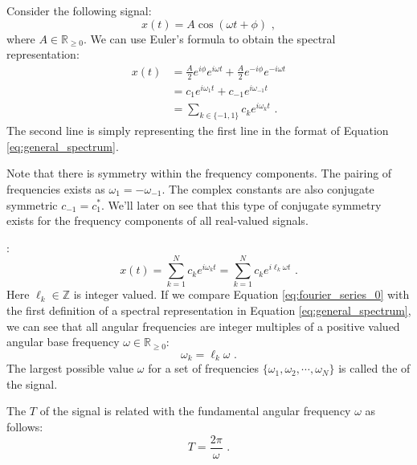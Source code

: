 Consider the following signal:
\begin{equation}
  x(t)=A\cos(\omega t+\phi) \,\,,
\end{equation}
where $A\in \mathbb{R}_{\ge 0}$. We can use Euler's formula to obtain the spectral representation:
\begin{align}
  x(t) & = \frac{A}{2}e^{i\phi}e^{i\omega t} + \frac{A}{2}e^{-i\phi}e^{-i\omega t} \\
       & = c_1 e^{i\omega_1 t} + c_{-1} e^{i\omega_{-1} t}                         \\
       & = \sum_{k\in\{-1,1\}} c_k e^{i\omega_k t} \,\,.
\end{align}
The second line is simply representing the first line in the format of Equation \ref{eq:general_spectrum}.

Note that there is symmetry within the frequency components. The pairing of frequencies exists as $\omega_{1}=-\omega_{-1}$.
The complex constants are also conjugate symmetric $c_{-1} = c_{1}^*$. We'll later on see
that this type of conjugate symmetry exists for the frequency components of all real-valued signals.

:
\begin{equation}
  x(t) = \sum_{k=1}^N c_k e^{i \omega_k t} = \sum_{k=1}^N c_k e^{i \ell_k \omega t} \,\,.
  \label{eq:fourier_series_0}
\end{equation}
Here $\ell_k \in \mathbb{Z}$ is integer valued. If we compare Equation \ref{eq:fourier_series_0} with
the first definition of a spectral representation in Equation \ref{eq:general_spectrum}, we can see
that all angular frequencies are integer multiples of a positive valued angular
base frequency $\omega \in \mathbb{R}_{\ge 0}$:
\begin{equation}
  \omega_k = \ell_k\omega \,\,.
  \label{eq:integer_multiple}
\end{equation}
The largest possible value $\omega$ for a set of frequencies $\{\omega_1,\omega_2,\cdots,\omega_N\}$
is called the \emph{} of the signal.

The \emph{} $T$ of the signal is related with the
fundamental angular frequency $\omega$ as follows:
\begin{equation}
  \boxed{
    T = \frac{2\pi}{\omega}
  } \,\,.
  \label{eq:fundamental_period}
\end{equation}

